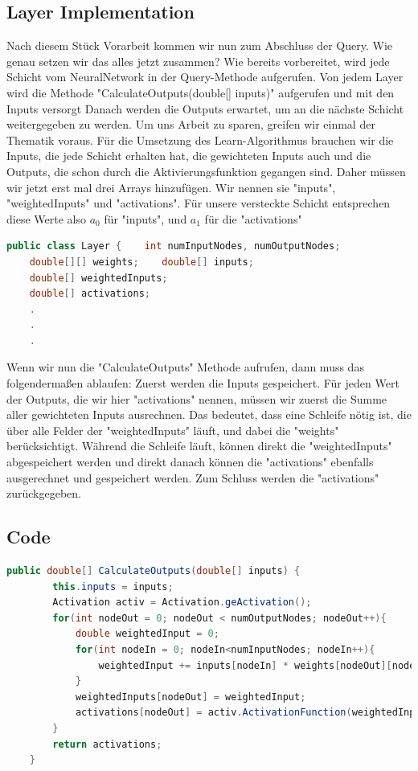 \documentclass[12pt]{article}
\begin{document}
\subsection{Layer Implementation}
Nach diesem Stück Vorarbeit kommen wir nun zum Abschluss der Query. Wie genau setzen wir das alles jetzt zusammen?
Wie bereits vorbereitet, wird jede Schicht vom NeuralNetwork in der Query-Methode aufgerufen. Von jedem Layer wird die Methode "CalculateOutputs(double[] inputs)" aufgerufen und mit den Inputs versorgt Danach werden die Outputs erwartet, um an die nächste Schicht weitergegeben zu werden.
Um uns Arbeit zu sparen, greifen wir einmal der Thematik voraus. Für die Umsetzung des Learn-Algorithmus brauchen wir die Inputs, die jede Schicht erhalten hat, die gewichteten Inputs auch und die Outputs, die schon durch die Aktivierungsfunktion gegangen sind. Daher müssen wir jetzt erst mal drei Arrays hinzufügen. Wir nennen sie "inputs", "weightedInputs" und "activations". Für unsere versteckte Schicht entsprechen diese Werte also $a_0$ für "inputs", und $a_1$ für die "activations"
\begin{lstlisting}[language=Java]
public class Layer {    int numInputNodes, numOutputNodes;
    double[][] weights;    double[] inputs;
    double[] weightedInputs;
    double[] activations;
    .
    .
    .
\end{lstlisting}
Wenn wir nun die "CalculateOutputs" Methode aufrufen, dann muss das folgendermaßen ablaufen:
Zuerst werden die Inputs gespeichert.
Für jeden Wert der Outputs, die wir hier "activations" nennen, müssen wir zuerst die Summe aller gewichteten Inputs ausrechnen. Das bedeutet, dass eine Schleife nötig ist, die über alle Felder der "weightedInputs" läuft, und dabei die "weights" berücksichtigt. Während die Schleife läuft, können direkt die "weightedInputs" abgespeichert werden und direkt danach können die "activations" ebenfalls ausgerechnet und gespeichert werden. Zum Schluss werden die "activations" zurückgegeben.
\subsection{Code}
\begin{lstlisting}[language=Java]
    public double[] CalculateOutputs(double[] inputs) {
        this.inputs = inputs;
        Activation activ = Activation.geActivation();
        for(int nodeOut = 0; nodeOut < numOutputNodes; nodeOut++){
            double weightedInput = 0;
            for(int nodeIn = 0; nodeIn<numInputNodes; nodeIn++){
                weightedInput += inputs[nodeIn] * weights[nodeOut][nodeIn];
            }
            weightedInputs[nodeOut] = weightedInput;
            activations[nodeOut] = activ.ActivationFunction(weightedInput);
        }
        return activations;
    }
\end{lstlisting}
\end{document}
